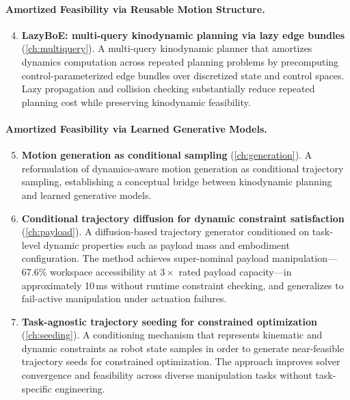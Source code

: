 \paragraph{Amortized Feasibility via Reusable Motion Structure.}
\begin{enumerate}
  \setcounter{enumi}{3}
  \item \textbf{LazyBoE: multi-query kinodynamic planning via lazy edge bundles} (\cref{ch:multiquery}).
        A multi-query kinodynamic planner that amortizes dynamics computation across repeated planning problems by precomputing control-parameterized edge bundles over discretized state and control spaces.
        Lazy propagation and collision checking substantially reduce repeated planning cost while preserving kinodynamic feasibility.
\end{enumerate}

\paragraph{Amortized Feasibility via Learned Generative Models.}
\begin{enumerate}
  \setcounter{enumi}{4}
  \item \textbf{Motion generation as conditional sampling} (\cref{ch:generation}).
        A reformulation of dynamics-aware motion generation as conditional trajectory sampling, establishing a conceptual bridge between kinodynamic planning and learned generative models.

  \item \textbf{Conditional trajectory diffusion for dynamic constraint satisfaction} (\cref{ch:payload}).
        A diffusion-based trajectory generator conditioned on task-level dynamic properties such as payload mass and embodiment configuration.
        The method achieves super-nominal payload manipulation---67.6\% workspace accessibility at $3\times$ rated payload capacity---in approximately 10\,ms without runtime constraint checking, and generalizes to fail-active manipulation under actuation failures.

  \item \textbf{Task-agnostic trajectory seeding for constrained optimization} (\cref{ch:seeding}).
        A conditioning mechanism that represents kinematic and dynamic constraints as robot state samples in order to generate near-feasible trajectory seeds for constrained optimization.
        The approach improves solver convergence and feasibility across diverse manipulation tasks without task-specific engineering.
\end{enumerate}

